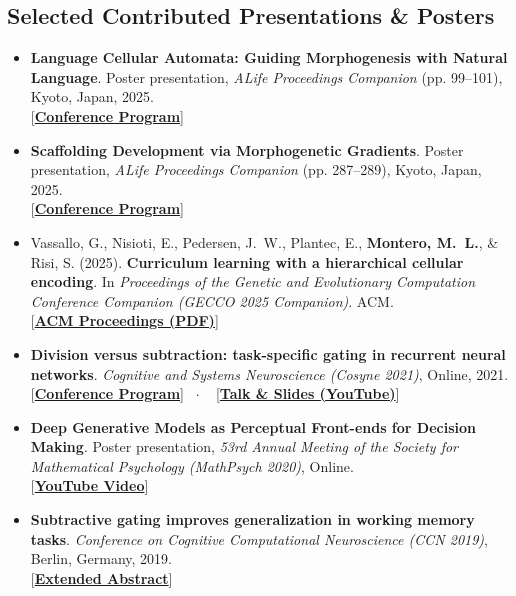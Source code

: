 \documentclass[10pt,a4paper]{article}
\newcommand{\linkbadge}[2]{%
  \textcolor{tagcolor}{[}\href{#2}{\textbf{#1}}\textcolor{tagcolor}{]}%
}
\begin{document}
\subsection*{Selected Contributed Presentations \& Posters}
\begin{itemize}[leftmargin=1.6em, itemsep=0.35em]
    \item \textbf{Language Cellular Automata: Guiding Morphogenesis with Natural Language}. Poster presentation, \textit{ALife Proceedings Companion} (pp. 99--101), Kyoto, Japan, 2025. \\
    \linkbadge{Conference Program}{https://drive.google.com/file/d/1Sg_MLUVagck_DdcrU3eNWUGTpK8RsYRT/view}

    \item \textbf{Scaffolding Development via Morphogenetic Gradients}. Poster presentation, \textit{ALife Proceedings Companion} (pp. 287--289), Kyoto, Japan, 2025. \\
    \linkbadge{Conference Program}{https://drive.google.com/file/d/1Sg_MLUVagck_DdcrU3eNWUGTpK8RsYRT/view}

    \item Vassallo, G., Nisioti, E., Pedersen, J.~W., Plantec, E., \textbf{Montero, M.~L.}, \& Risi, S. (2025). \textbf{Curriculum learning with a hierarchical cellular encoding}. In \textit{Proceedings of the Genetic and Evolutionary Computation Conference Companion (GECCO 2025 Companion)}. ACM. \\
    \linkbadge{ACM Proceedings (PDF)}{https://dl.acm.org/doi/pdf/10.1145/3712255.3726672}

    \item \textbf{Division versus subtraction: task-specific gating in recurrent neural networks}. \textit{Cognitive and Systems Neuroscience (Cosyne 2021)}, Online, 2021. \\
    \linkbadge{Conference Program}{https://static1.squarespace.com/static/6102ca347474c263c40150cd/t/610870a432c9d257a80cace4/1627943077187/Cosyne2021_program_book.pdf}  \ $\cdot$ \
    \linkbadge{Talk \& Slides (YouTube)}{https://www.youtube.com/watch?v=r8kVb1yDV44}

    \item \textbf{Deep Generative Models as Perceptual Front-ends for Decision Making}. Poster presentation, \textit{53rd Annual Meeting of the Society for Mathematical Psychology (MathPsych 2020)}, Online. \\
    \linkbadge{YouTube Video}{https://youtu.be/9Sje1N35dM0?si=ciZ4ExxLT_0BC-UO}

    \item \textbf{Subtractive gating improves generalization in working memory tasks}. \textit{Conference on Cognitive Computational Neuroscience (CCN 2019)}, Berlin, Germany, 2019. \\
    \linkbadge{Extended Abstract}{https://pdfs.semanticscholar.org/fb2b/329a6d27bcea8f58749f2ff04c353402ad8d.pdf}
\end{itemize}
\end{document}
